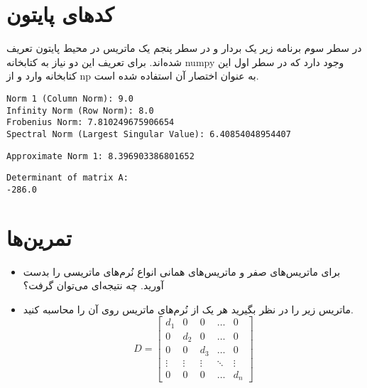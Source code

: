 \section{کدهای پایتون}
\begin{code}
	در سطر سوم برنامه زیر یک بردار و در سطر پنجم یک ماتریس در محیط پایتون تعریف شده‌اند. برای تعریف این دو نیاز به کتابخانه numpy وجود دارد که در سطر اول این کتابخانه وارد و از np به عنوان اختصار آن استفاده شده است.
	\begin{latin}
		  
	\end{latin}
\end{code}
\begin{code}
	\begin{latin}
		 
		\texttt{Norm 1 (Column Norm): 9.0\\
		Infinity Norm (Row Norm): 8.0\\
		Frobenius Norm: 7.810249675906654\\
		Spectral Norm (Largest Singular Value): 6.40854048954407 }
	\end{latin}
\end{code}

\begin{code}
	\begin{latin}
		  
		\texttt{Approximate Norm 1: 8.396903386801652}
	\end{latin}
\end{code}
\begin{code}
	\begin{latin}
		  
\texttt{Determinant of matrix A:\\
-286.0}
	\end{latin}
\end{code}
\section{تمرین‌ها}
\begin{exercise}
	\begin{itemize}
		\item 
برای ماتریس‌های صفر و ماتریس‌های همانی انواع نُرم‌های ماتریسی را بدست آورید. چه نتیجه‌ای می‌توان گرفت؟
\item 
ماتریس زیر را در نظر بگیرید هر یک از نُرم‌های ماتریس روی آن را محاسبه کنید.
\[
D =
\begin{bmatrix}
	d_1 & 0 & 0 & \dots & 0 \\
	0 & d_2 & 0 & \dots & 0 \\
	0 & 0 & d_3 & \dots & 0 \\
	\vdots & \vdots & \vdots & \ddots & \vdots \\
	0 & 0 & 0 & \dots & d_n
\end{bmatrix}
\]
\end{itemize}
\end{exercise}
